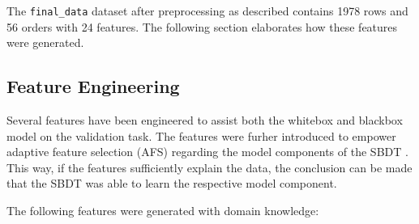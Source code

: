 The \texttt{final\_data} dataset after preprocessing as described contains 1978 rows and 56 orders with 24 features. The following section elaborates how these features were generated.

\subsection*{Feature Engineering}
\label{sec:feature-engineering}

Several features have been engineered to assist both the whitebox and blackbox model on the validation task. The features were furher introduced to empower adaptive feature selection (AFS) regarding the model components of the SBDT \autocite{Schwede2024}. This way, if the features sufficiently explain the data, the conclusion can be made that the SBDT was able to learn the respective model component.

The following features were generated with domain knowledge:

